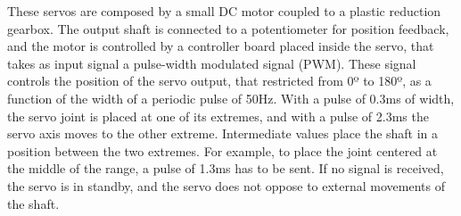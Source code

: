 These servos are composed by a small DC motor coupled to a plastic reduction gearbox. The output shaft is connected to a potentiometer for position feedback, and the motor is controlled by a controller board placed inside the servo, that takes as input signal a pulse-width modulated signal (PWM). These signal controls the position of the servo output, that restricted from 0º to 180º, as a function of the width of a periodic pulse of 50Hz. With a pulse of 0.3ms of width, the servo joint is placed at one of its extremes, and with a pulse of 2.3ms the servo axis moves to the other extreme. Intermediate values place the shaft in a position between the two extremes. For example, to place the joint centered at the middle of the range, a pulse of 1.3ms has to be sent. If no signal is received, the servo is in standby, and the servo does not oppose to external movements of the shaft. 

